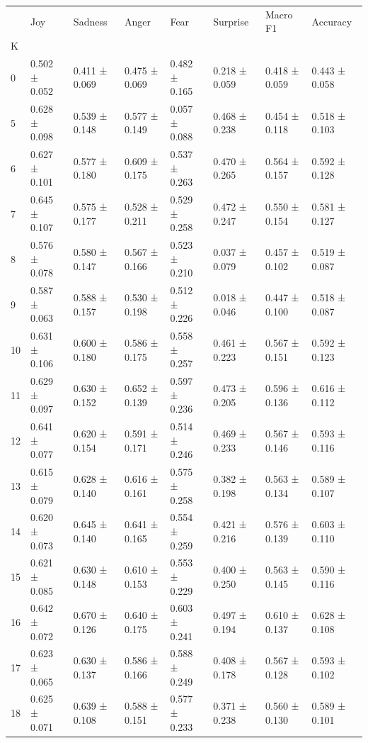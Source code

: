 \begin{tabular}{llllllll}
\toprule
 & Joy & Sadness & Anger & Fear & Surprise & Macro F1 & Accuracy \\
K &  &  &  &  &  &  &  \\
\midrule
0 & 0.502 ± 0.052 & 0.411 ± 0.069 & 0.475 ± 0.069 & 0.482 ± 0.165 & 0.218 ± 0.059 & 0.418 ± 0.059 & 0.443 ± 0.058 \\
5 & 0.628 ± 0.098 & 0.539 ± 0.148 & 0.577 ± 0.149 & 0.057 ± 0.088 & 0.468 ± 0.238 & 0.454 ± 0.118 & 0.518 ± 0.103 \\
6 & 0.627 ± 0.101 & 0.577 ± 0.180 & 0.609 ± 0.175 & 0.537 ± 0.263 & 0.470 ± 0.265 & 0.564 ± 0.157 & 0.592 ± 0.128 \\
7 & 0.645 ± 0.107 & 0.575 ± 0.177 & 0.528 ± 0.211 & 0.529 ± 0.258 & 0.472 ± 0.247 & 0.550 ± 0.154 & 0.581 ± 0.127 \\
8 & 0.576 ± 0.078 & 0.580 ± 0.147 & 0.567 ± 0.166 & 0.523 ± 0.210 & 0.037 ± 0.079 & 0.457 ± 0.102 & 0.519 ± 0.087 \\
9 & 0.587 ± 0.063 & 0.588 ± 0.157 & 0.530 ± 0.198 & 0.512 ± 0.226 & 0.018 ± 0.046 & 0.447 ± 0.100 & 0.518 ± 0.087 \\
10 & 0.631 ± 0.106 & 0.600 ± 0.180 & 0.586 ± 0.175 & 0.558 ± 0.257 & 0.461 ± 0.223 & 0.567 ± 0.151 & 0.592 ± 0.123 \\
11 & 0.629 ± 0.097 & 0.630 ± 0.152 & 0.652 ± 0.139 & 0.597 ± 0.236 & 0.473 ± 0.205 & 0.596 ± 0.136 & 0.616 ± 0.112 \\
12 & 0.641 ± 0.077 & 0.620 ± 0.154 & 0.591 ± 0.171 & 0.514 ± 0.246 & 0.469 ± 0.233 & 0.567 ± 0.146 & 0.593 ± 0.116 \\
13 & 0.615 ± 0.079 & 0.628 ± 0.140 & 0.616 ± 0.161 & 0.575 ± 0.258 & 0.382 ± 0.198 & 0.563 ± 0.134 & 0.589 ± 0.107 \\
14 & 0.620 ± 0.073 & 0.645 ± 0.140 & 0.641 ± 0.165 & 0.554 ± 0.259 & 0.421 ± 0.216 & 0.576 ± 0.139 & 0.603 ± 0.110 \\
15 & 0.621 ± 0.085 & 0.630 ± 0.148 & 0.610 ± 0.153 & 0.553 ± 0.229 & 0.400 ± 0.250 & 0.563 ± 0.145 & 0.590 ± 0.116 \\
16 & 0.642 ± 0.072 & 0.670 ± 0.126 & 0.640 ± 0.175 & 0.603 ± 0.241 & 0.497 ± 0.194 & 0.610 ± 0.137 & 0.628 ± 0.108 \\
17 & 0.623 ± 0.065 & 0.630 ± 0.137 & 0.586 ± 0.166 & 0.588 ± 0.249 & 0.408 ± 0.178 & 0.567 ± 0.128 & 0.593 ± 0.102 \\
18 & 0.625 ± 0.071 & 0.639 ± 0.108 & 0.588 ± 0.151 & 0.577 ± 0.233 & 0.371 ± 0.238 & 0.560 ± 0.130 & 0.589 ± 0.101 \\

\end{tabular}
